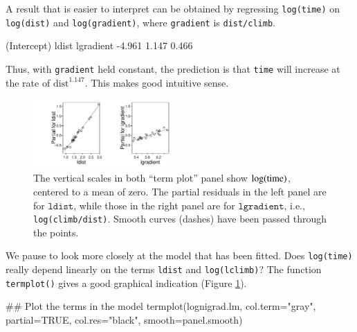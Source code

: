 \documentclass{tufte-book}\usepackage[]{graphicx}\usepackage[]{color}
\newcommand{\txtt}[1]{\texttt{#1}}
\begin{document}
A result that is easier to interpret can be obtained by regressing
\txtt{log(time)} on \txtt{log(dist)} and \txtt{log(gradient)},
where \txtt{gradient} is \txtt{dist/climb}.
\begin{Schunk}
\begin{Soutput}
(Intercept)       ldist   lgradient 
     -4.961       1.147       0.466 
\end{Soutput}
\end{Schunk}
Thus, with \txtt{gradient} held constant, the prediction is that \txtt{time}
will increase at the rate of $\mbox{dist}^{1.147}$.  This makes good intuitive
sense.

\begin{figure}
\begin{Schunk}


\centerline{\includegraphics[width=0.47\textwidth]{figs/11-tplot-ni-1} }

\end{Schunk}
\caption{The vertical scales in both ``term plot''  panel
  show $\log(\rm{time})$, centered to a mean of zero. The partial residuals
  in the left panel are for $\txtt{ldist}$, while those in the right
  panel are for $\txtt{lgradient}$, i.e.,
  \txtt{log(climb/dist)}. Smooth curves (dashes) have been passed
  through the points.\label{fig:lnihills-lin}}
\vspace*{-15pt}
\end{figure}

We pause to look more closely at the model that has been fitted.  Does
\txtt{log(time)} really depend linearly on the terms \txtt{ldist} and
\txtt{log(lclimb)}?  The function \txtt{termplot()} gives a good
graphical indication (Figure \ref{fig:lnihills-lin}).
\begin{Schunk}
\begin{Sinput}
## Plot the terms in the model
termplot(lognigrad.lm, col.term="gray", partial=TRUE,
         col.res="black", smooth=panel.smooth)
\end{Sinput}
\end{Schunk}
\end{document}
